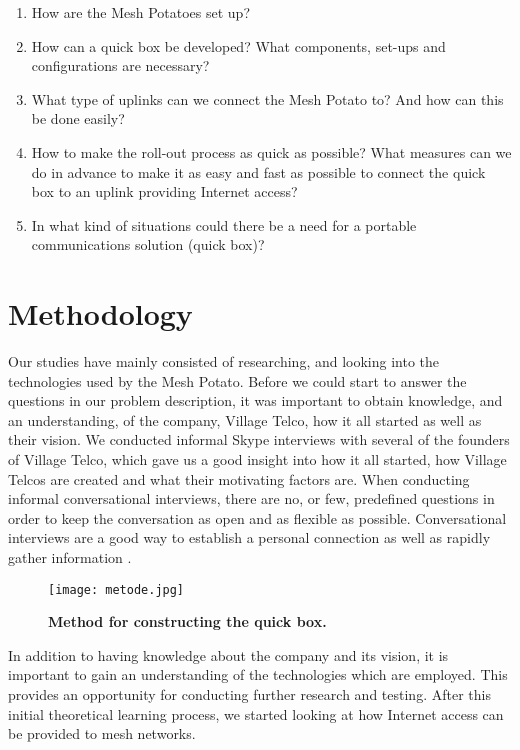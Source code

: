 \begin{enumerate}
\item How are the Mesh Potatoes set up? 
\item How can a \gls{quick} box be developed? What components, set-ups and configurations are necessary?
\item What type of uplinks can we connect the Mesh Potato to? And how can this be done easily? 
\item How to make the roll-out process as quick as possible? What measures can we do in advance to make it as easy and fast as possible to connect the \gls{quick} box to an uplink providing Internet access?
\item In what kind of situations could there be a need for a portable communications solution (\gls{quick} box)?
\end{enumerate}


\section{Methodology}

Our studies have mainly consisted of researching, and looking into the technologies used by the Mesh Potato. Before we could start to answer the questions in our problem description, it was important to obtain knowledge, and an understanding, of the company, Village Telco, how it all started as well as their vision. We conducted informal Skype interviews with several of the founders of Village Telco, which gave us a good insight into how it all started, how Village Telcos are created and what their motivating factors are. When conducting informal conversational interviews, there are no, or few, predefined questions in order to keep the conversation as open and as flexible as possible. Conversational interviews are a good way to establish a personal connection as well as rapidly gather information \cite{interview}. 

\begin{figure}[b]
  \centering
      \texttt{[image: metode.jpg]}
  \caption [Method for constructing the \gls{quick} box.]{\textbf{Method for constructing the \gls{quick} box.}}
  \label{fig:metode}
\end{figure}


In addition to having knowledge about the company and its vision, it is important to gain an understanding of the technologies which are employed. This provides an opportunity for conducting further research and testing. After this initial theoretical learning process, we started looking at how Internet access can be provided to mesh networks. 

